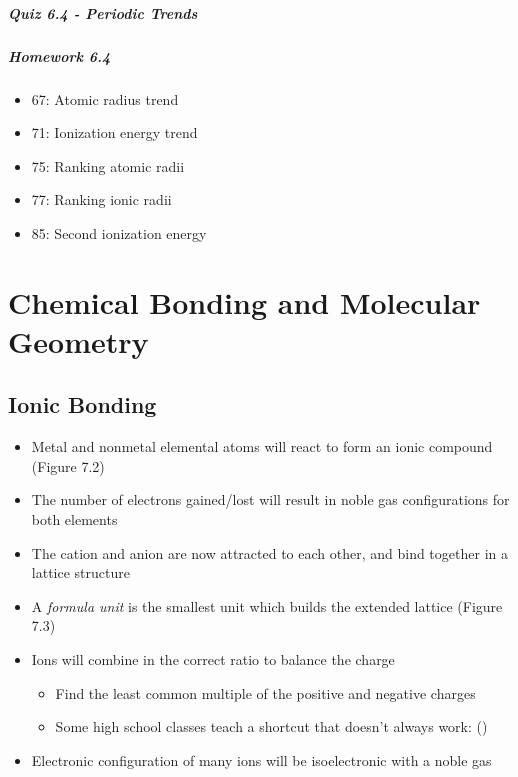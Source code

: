 \documentclass[12pt, openany, letterpaper]{memoir}
\begin{document}
\paragraph*{Quiz 6.4 - Periodic Trends}
\paragraph*{Homework 6.4}
\begin{itemize}
  \item 67: Atomic radius trend
  \item 71: Ionization energy trend
  \item 75: Ranking atomic radii
  \item 77: Ranking ionic radii
  \item 85: Second ionization energy
\end{itemize}

\chapter{Chemical Bonding and Molecular Geometry}

\section{Ionic Bonding}
\begin{itemize}
	\item Metal and nonmetal elemental atoms will react to form an ionic compound (Figure 7.2)
	\item The number of electrons gained/lost will result in noble gas configurations for both elements
	\item The cation and anion are now attracted to each other, and bind together in a lattice structure
	\item A \emph{formula unit} is the smallest unit which builds the extended lattice (Figure 7.3)
  \item Ions will combine in the correct ratio to balance the charge
    \begin{itemize}
      \item Find the least common multiple of the positive and negative charges
      \item Some high school classes teach a shortcut that doesn't always work: ()
    \end{itemize}
  \item Electronic configuration of many ions will be isoelectronic with a noble gas
\end{itemize}
\end{document}
